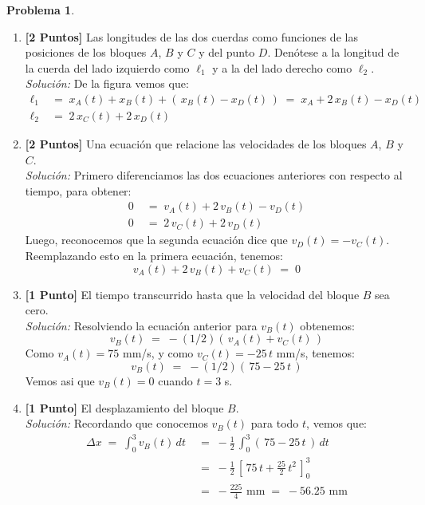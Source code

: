 \documentclass[ a4paper, twoside, 11pt]{article}
\theoremstyle{definition}
\newtheorem{problem}[definition]{Problema}
\begin{document}
\begin{problem}
\begin{enumerate}[label=\alph*.]
\item \textbf{[2 Puntos]} Las longitudes de las dos cuerdas como funciones de las posiciones de los bloques $A$, $B$ y $C$ y del punto $D$. Den\'otese a la longitud de la cuerda del lado izquierdo como $\ell_1$ y a la del lado derecho como $\ell_2$. \\ \emph{Soluci\'on:} De la figura vemos que: 
\begin{align*}
\ell_1 \; 
& = \; x_A(t) + x_B(t) + ( \, x_B(t) - x_D(t) \, ) 
\; = \; x_A + 2 \, x_B(t) - x_D(t) \\
\ell_2 \; & = \; 2 \, x_C(t) + 2 \, x_D(t)
\end{align*}
\item \textbf{[2 Puntos]} Una ecuaci\'on que relacione las velocidades de los bloques $A$, $B$ y $C$. \\ \emph{Soluci\'on:} Primero diferenciamos las dos ecuaciones anteriores con respecto al tiempo, para obtener: 
\begin{align*}
0 \; 
& = \; v_A(t) + 2 \, v_B(t) - v_D(t) \\
0 \; & = \; 2 \, v_C(t) + 2 \, v_D(t)
\end{align*}
Luego, reconocemos que la segunda ecuaci\'on dice que $v_D(t) = -v_C(t)$. Reemplazando esto en la primera ecuaci\'on, tenemos: 
\[
v_A(t) + 2 \, v_B(t) + v_C(t) \; = \; 0
\]
\item \textbf{[1 Punto]} El tiempo transcurrido hasta que la velocidad del bloque $B$ sea cero. \\ \emph{Soluci\'on:} Resolviendo la ecuaci\'on anterior para $v_B(t)$ obtenemos: 
\[
v_B(t) \; = \; -(1/2)( \, v_A(t) + v_C(t) \, )
\]
Como $v_A(t) = 75$ mm/s, y como $v_C(t) = -25 \, t$ mm/s, tenemos: 
\[
v_B(t) \; = \; -(1/2)( \, 75 - 25 \, t \, )
\]
Vemos asi que $v_B(t) = 0$ cuando $t = 3$ s. 
\item \textbf{[1 Punto]} El desplazamiento del bloque $B$. \\ \emph{Soluci\'on:} Recordando que conocemos $v_B(t)$ para todo $t$, vemos que: 
\begin{align*}
\Delta x 
\; = \; \int_0^3 v_B(t) \, dt \; 
& = \; - \frac{1}{2} \, 
\int_0^3 ( \, 75 - 25 \, t \, ) \, dt \\[1ex]
& = \; - \frac{1}{2} \, 
\left[ \, 75 \, t + \frac{25}{2} \, t^2 \, \right]_0^3 \\[1ex]
& = \; -\frac{225}{4} \text{ mm} \; = \; -56.25 \text{ mm}
\end{align*}
\end{enumerate}

\end{problem}
\vspace{\baselineskip}
\end{document}
